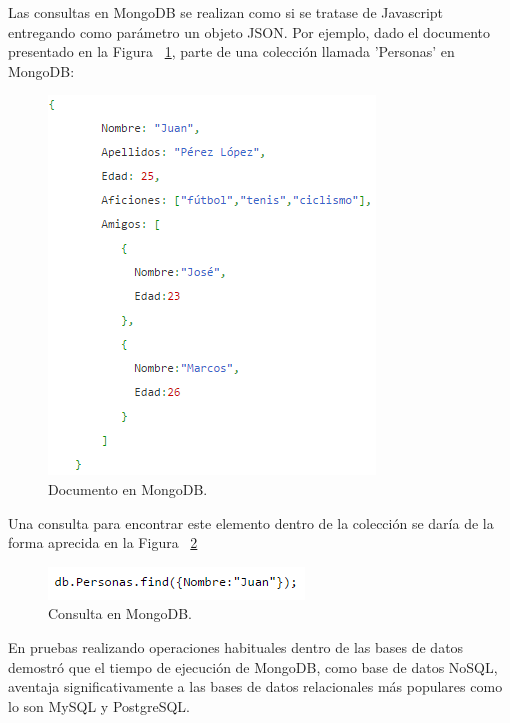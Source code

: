 	Las consultas en MongoDB se realizan como si se tratase de Javascript entregando como parámetro un objeto JSON. Por ejemplo, dado el documento presentado en la Figura ~\ref{fig:MongoJsonExample}, parte de una colección llamada 'Personas' en MongoDB:

	\begin{figure}[H]
		\centering
		\captionsetup{justification=centering}
		\includegraphics[scale=0.8]{images/MongoJsonExample.png}
		\caption[Documento en MongoDB.]{Documento en MongoDB.}
		\label{fig:MongoJsonExample}
	\end{figure}

	Una consulta para encontrar este elemento dentro de la colección se daría de la forma aprecida en la Figura ~\ref{fig:MongoJsonQueryExample}\\

	\begin{figure}[H]
		\centering
		\captionsetup{justification=centering}
		\includegraphics[scale=0.8]{images/MongoJsonQueryExample.png}
		\caption[Consulta en MongoDB.]{Consulta en MongoDB.}
		\label{fig:MongoJsonQueryExample}
	\end{figure}

	En pruebas realizando operaciones habituales dentro de las bases de datos \cite{MongoPerformance} demostró que el tiempo de ejecución de MongoDB, como base de datos NoSQL, aventaja significativamente a las bases de datos relacionales más populares como lo son MySQL y PostgreSQL.


	